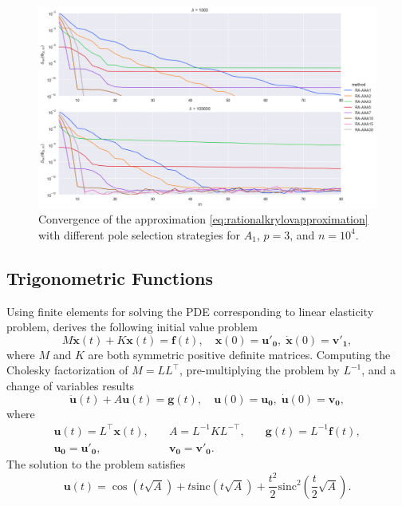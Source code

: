 \begin{figure}[h]
    \centering
    \includegraphics[width=.9\textwidth]{img/krylovapproximation/cnvg_poles_n1e04_p03.png}
    \caption{
        Convergence of the approximation \eqref{eq:rationalkrylovapproximation} with different
        pole selection strategies for $A_1$, $p=3$, and $n=10^4$.
    }
    \label{fig:rationalkrylovpoleselection}
\end{figure}

\FloatBarrier
\subsection{Trigonometric Functions}
Using finite elements for solving the PDE corresponding to linear elasticity problem,
\cite{voet2020linearelasticity} derives the following initial value problem
\begin{equation*}
    M \mathbf{\ddot{x}}(t) + K \mathbf{x}(t) = \mathbf{f}(t), \quad
    \mathbf{x}(0) = \mathbf{u'_0}, \; \mathbf{\dot{x}}(0) = \mathbf{v'_1},
\end{equation*}
where $M$ and $K$ are both symmetric positive definite matrices.
Computing the Cholesky factorization of $M = LL^{\top}$, pre-multiplying the problem by $L^{-1}$,
and a change of variables results
\begin{equation}
    \mathbf{\ddot{u}}(t) + A \mathbf{u}(t) = \mathbf{g}(t), \quad
    \mathbf{u}(0) = \mathbf{u_0}, \; \mathbf{\dot{u}}(0) = \mathbf{v_0},
\end{equation}
where
\begin{equation*}
    \begin{aligned}
        & \mathbf{u}(t) = L^{\top} \mathbf{x}(t), \quad & A = L^{-1} K L^{-\top}, \quad & \mathbf{g}(t) = L^{-1} \mathbf{f}(t), & \\
        & \mathbf{u_0} = \mathbf{u'_0}, & \mathbf{v_0} = \mathbf{v'_0}. & &
    \end{aligned}
\end{equation*}
The solution to the problem satisfies
\begin{equation}
    \mathbf{u}(t) = \cos(t\sqrt{A}) + t \mathrm{sinc}(t\sqrt{A}) + \frac{t^2}{2} \mathrm{sinc}^2(\frac{t}{2} \sqrt{A}).
\end{equation}

